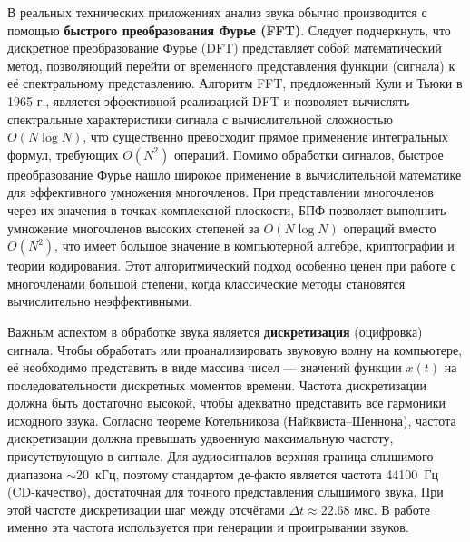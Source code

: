\documentclass[bachelor, och, diploma]{SCWorks}
\begin{document}
В реальных технических приложениях анализ звука обычно производится с помощью \textbf{быстрого преобразования Фурье (FFT)}. Следует подчеркнуть, что дискретное преобразование Фурье (DFT) представляет собой математический метод, позволяющий перейти от временного представления функции (сигнала) к её спектральному представлению. Алгоритм FFT, предложенный Кули и Тьюки в 1965 г.\cite{cooley-tukey}, является эффективной реализацией DFT и позволяет вычислять спектральные характеристики сигнала с вычислительной сложностью $O(N \log N)$, что существенно превосходит прямое применение интегральных формул, требующих $O(N^2)$ операций. Помимо обработки сигналов, быстрое преобразование Фурье нашло широкое применение в вычислительной математике для эффективного умножения многочленов. При представлении многочленов через их значения в точках комплексной плоскости, БПФ позволяет выполнить умножение многочленов высоких степеней за $O(N \log N)$ операций вместо $O(N^2)$, что имеет большое значение в компьютерной алгебре, криптографии и теории кодирования. Этот алгоритмический подход особенно ценен при работе с многочленами большой степени, когда классические методы становятся вычислительно неэффективными.




Важным аспектом в обработке звука является \textbf{дискретизация} (оцифровка) сигнала. Чтобы обработать или проанализировать звуковую волну на компьютере, её необходимо представить в виде массива чисел --- значений функции $x(t)$ на последовательности дискретных моментов времени. Частота дискретизации должна быть достаточно высокой, чтобы адекватно представить все гармоники исходного звука. Согласно теореме Котельникова (Найквиста--Шеннона), частота дискретизации должна превышать удвоенную максимальную частоту, присутствующую в сигнале\cite{shannon}. Для аудиосигналов верхняя граница слышимого диапазона $\sim$20~кГц, поэтому стандартом де-факто является частота 44100~Гц (CD-качество), достаточная для точного представления слышимого звука. При этой частоте дискретизации шаг между отсчётами $\Delta t \approx 22.68$ мкс\cite{opp-dsp}. В работе именно эта частота используется при генерации и проигрывании звуков.
\end{document}

